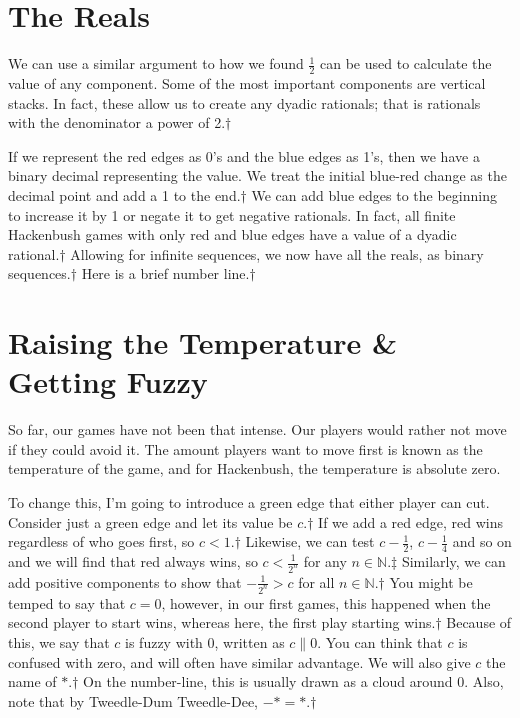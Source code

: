 \documentclass[]{article}
\newcommand{\nextslide}{$\dagger$}
\newcommand{\nextslides}{$\ddagger$}
\newcommand{\fuzzy}{\parallel}
\renewcommand{\star}{\mathord{*}}
\begin{document}
\section{The Reals}
We can use a similar argument to how we found $\frac{1}{2}$ can be used to calculate the value of any component. Some of the most important components are vertical stacks. In fact, these allow us to create any dyadic rationals; that is rationals with the denominator a power of 2.\nextslide{}

If we represent the red edges as 0's and the blue edges as 1's, then we have a binary decimal representing the value. We treat the initial blue-red change as the decimal point and add a 1 to the end.\nextslide{} We can add blue edges to the beginning to increase it by 1 or negate it to get negative rationals. In fact, all finite Hackenbush games with only red and blue edges have a value of a dyadic rational.\nextslide{} Allowing for infinite sequences, we now have all the reals, as binary sequences.\nextslide{} Here is a brief number line.\nextslide{}

\section{Raising the Temperature \& Getting Fuzzy}
So far, our games have not been that intense. Our players would rather not move if they could avoid it. The amount players want to move first is known as the temperature of the game, and for Hackenbush, the temperature is absolute zero.

To change this, I'm going to introduce a green edge that either player can cut. Consider just a green edge and let its value be $c$.\nextslide{} If we add a red edge, red wins regardless of who goes first, so $c<1$.\nextslide{} Likewise, we can test $c-\frac{1}{2}$, $c-\frac{1}{4}$ and so on and we will find that red always wins, so $c<\frac{1}{2^n}$ for any $n\in\mathbb{N}$.\nextslides{} Similarly, we can add positive components to show that $-\frac{1}{2^n}>c$ for all $n\in\mathbb{N}$.\nextslide{} You might be temped to say that $c=0$, however, in our first games, this happened when the second player to start wins, whereas here, the first play starting wins.\nextslide{} Because of this, we say that $c$ is fuzzy with 0, written as $c\fuzzy 0$. You can think that $c$ is confused with zero, and will often have similar advantage. We will also give $c$ the name of $\star$.\nextslide{} On the number-line, this is usually drawn as a cloud around 0. Also, note that by Tweedle-Dum Tweedle-Dee, $-\star=\star$.\nextslide{}
\end{document}
